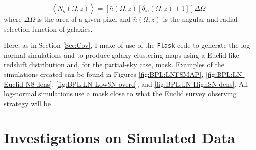 \begin{equation}
\label{Eq:Poiss}
\left\langle N_g(\Omega,z) \right\rangle = \left[\bar{n}(\Omega,z)\left[ \delta_m (\Omega,z) + 1 \right] \right]\Delta\Omega
\end{equation}
where $\Delta\Omega$ is the area of a given pixel and $\bar{n}(\Omega,z)$ is the angular and radial selection function of galaxies. 

\qquad Here, as in Section \ref{Sec:Cov}, I make of use of the \texttt{Flask} code to generate the log-normal simulations \citep{Flask2016} and to produce galaxy clustering maps using a Euclid-like redshift distribution and, for the partial-sky case, mask. Examples of the simulations created can be found in Figures \ref{fig:BPL:LNFSMAP},  \ref{fig:BPL:LN-Euclid-N8-dens}, \ref{fig:BPL:LN-LowSN-overd}, and \ref{fig:BPL:LN-HighSN-dens}. All log-normal simulations use a mask close to what the Euclid survey observing strategy will be \citep{2011EuclidRedPaper}. %


\section{Investigations on Simulated Data}\label{Sec:BPL:Investigations}

